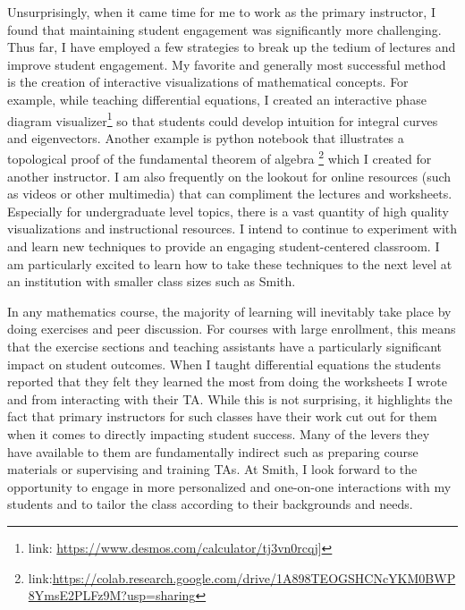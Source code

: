 \documentclass{article}
\begin{document}
Unsurprisingly, when it came time for me to work as the primary instructor, I found that maintaining student engagement was significantly more challenging. Thus far,
I have employed a few strategies to break up the tedium of lectures and improve student engagement. My favorite and generally most successful method is the creation of interactive visualizations of mathematical concepts. For example, while teaching differential equations, I created an interactive phase diagram visualizer\footnote{link: \url{https://www.desmos.com/calculator/tj3vn0rcqj}]} so that students could develop intuition for integral curves and eigenvectors. Another example is python notebook that illustrates a topological proof of the fundamental theorem of algebra \footnote{link:\url{https://colab.research.google.com/drive/1A898TEOGSHCNcYKM0BWP8YmsE2PLFz9M?usp=sharing}} which I created for another instructor. 
I am also frequently on the lookout for online resources (such as videos or other multimedia) that can compliment the lectures and worksheets. Especially for undergraduate level topics, there is a vast quantity of high quality visualizations and instructional resources. I intend to continue to experiment with and learn new techniques to provide an engaging student-centered classroom. I am particularly excited to learn how to take these techniques to the next level at an institution with smaller class sizes such as Smith.

In any mathematics course, the majority of learning will inevitably take place by doing exercises and peer discussion. For courses with large enrollment, this means that the exercise sections and teaching assistants have a particularly significant impact on student outcomes. When I taught differential equations the students reported that they felt they learned the most from doing the worksheets I wrote and from interacting with their TA. While this is not surprising, it highlights the fact that primary instructors for such classes have their work cut out for them when it comes to directly impacting student success. Many of the levers they have available to them are fundamentally indirect such as preparing course materials or supervising and training TAs. At Smith, I look forward to the opportunity to engage in more personalized and one-on-one interactions with my students and to tailor the class according to their backgrounds and needs.
\end{document}
